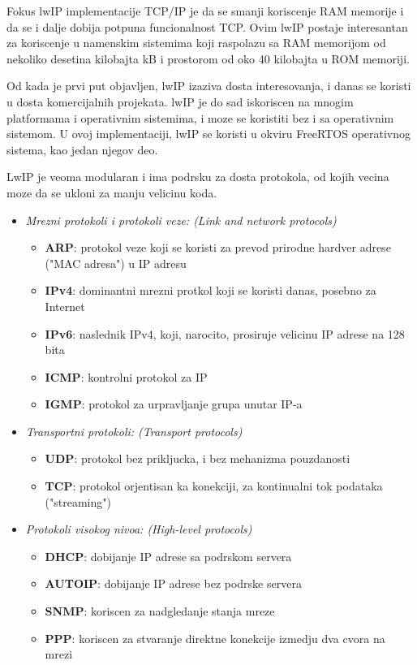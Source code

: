 \documentclass[a4paper,12pt, master]{etf}
\begin{document}
	Fokus lwIP implementacije TCP/IP je da se smanji koriscenje RAM memorije i da se i dalje 
	dobija potpuna funcionalnost TCP. Ovim lwIP postaje interesantan za koriscenje u namenskim 
	sistemima koji raspolazu sa RAM memorijom od nekoliko desetina kilobajta kB i prostorom od 
	oko 40 kilobajta u ROM memoriji.

	Od kada je prvi put objavljen, lwIP izaziva dosta interesovanja, i danas se koristi u dosta
	komercijalnih projekata. lwIP je do sad iskoriscen na mnogim platformama i operativnim
	sistemima, i moze se koristiti bez i sa operativnim sistemom. U ovoj implementaciji, lwIP 
	se koristi u okviru FreeRTOS operativnog sistema, kao jedan njegov deo.

	LwIP je veoma modularan i ima podrsku za dosta protokola, od kojih vecina moze da se 
	ukloni za manju velicinu koda.
	\begin{itemize}
		\item \textit{Mrezni protokoli i protokoli veze: (Link and network protocols)}
		\begin{itemize}
			\item \textbf{ARP}: protokol veze koji se koristi za prevod prirodne hardver adrese
			("MAC adresa") u IP adresu
			\item \textbf{IPv4}: dominantni mrezni protkol koji se koristi danas, posebno za
			Internet
			\item \textbf{IPv6}: naslednik IPv4, koji, narocito, prosiruje velicinu IP adrese 
			na 128 bita
			\item \textbf{ICMP}: kontrolni protokol za IP
			\item \textbf{IGMP}: protokol za urpravljanje grupa unutar IP-a
		\end{itemize}
		\item \textit{Transportni protokoli: (Transport protocols)}
			\begin{itemize}
				\item \textbf{UDP}: protokol bez prikljucka, i bez mehanizma pouzdanosti
				\item \textbf{TCP}: protokol orjentisan ka konekciji, za kontinualni tok 
				podataka ("streaming")
			\end{itemize}
		\item \textit{Protokoli visokog nivoa: (High-level protocols)}
			\begin{itemize}
				\item \textbf{DHCP}: dobijanje IP adrese sa podrskom servera
				\item \textbf{AUTOIP}: dobijanje IP adrese bez podrske servera
				\item \textbf{SNMP}: koriscen za nadgledanje stanja mreze
				\item \textbf{PPP}: koriscen za stvaranje direktne konekcije izmedju dva cvora 
				na mrezi
			\end{itemize}
	\end{itemize}
\end{document}
